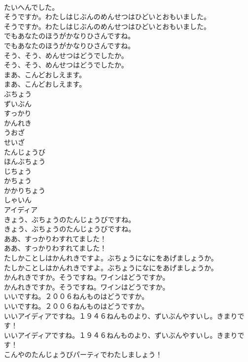 \documentclass[8pt]{extreport}
\begin{document}
\begin{CJK}{UTF8}{min}
\\	たいへんでした。 
\\	そうですか。わたしはじぶんのめんせつはひどいとおもいました。	
\\	そうですか。わたしはじぶんのめんせつはひどいとおもいました。 
\\	でもあなたのほうがかなりひさんですね。	
\\	でもあなたのほうがかなりひさんですね。 
\\	そう、そう、めんせつはどうでしたか。	
\\	そう、そう、めんせつはどうでしたか。 
\\	まあ、こんどおしえます。	
\\	まあ、こんどおしえます。 
\\	ぶちょう
\\	ずいぶん
\\	すっかり
\\	かんれき
\\	うおざ
\\	せいざ
\\	たんじょうび
\\	ほんぶちょう
\\	じちょう
\\	かちょう
\\	かかりちょう
\\	しゃいん
\\	アイディア
\\	きょう、ぶちょうのたんじょうびですね。	
\\	きょう、ぶちょうのたんじょうびですね。 
\\	ああ、すっかりわすれてました！	
\\	ああ、すっかりわすれてました！ 
\\	たしかことしはかんれきですよ。ぶちょうになにをあげましょうか。	
\\	たしかことしはかんれきですよ。ぶちょうになにをあげましょうか。 
\\	かんれきですか。そうですね。ワインはどうですか。	
\\	かんれきですか。そうですね。ワインはどうですか。 
\\	いいですね。２００６ねんものはどうですか。	
\\	いいですね。２００６ねんものはどうですか。 
\\	いいアイディアですね。１９４６ねんものより、ずいぶんやすいし。きまりです！	
\\	いいアイディアですね。１９４６ねんものより、ずいぶんやすいし。きまりです！ 
\\	こんやのたんじょうびパーティでわたしましょう！	

\end{CJK}
\end{document}

